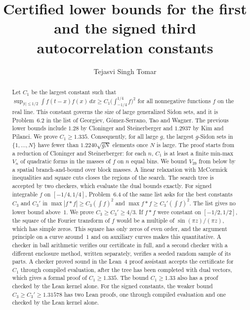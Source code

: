 \documentclass[11pt]{amsart}
\theoremstyle{definition}
\theoremstyle{remark}
\numberwithin{equation}{section}
\newcommand{\Cone}{1.335}
\newcommand{\Nbins}{39}
\newcommand{\SidonVal}{1.2240}
\newcommand{\CthrPDec}{4/3}
\newcommand{\LeanSigDec}{1.31578}
\begin{document}
\title[Lower bounds for autocorrelation constants]{Certified lower bounds for the first and the signed third autocorrelation constants}
\author{Tejasvi Singh Tomar}
\renewcommand{\urladdrname}{{\itshape ORCID}}

\begin{abstract}
Let $C_1$ be the largest constant such that $\sup_{|t|\le 1/2}\int f(t-x)f(x)\,dx\ge C_1\bigl(\int_{-1/4}^{1/4}f\bigr)^2$ for all nonnegative functions $f$ on the real line. This constant governs the size of large generalized Sidon sets, and it is Problem~6.2 in the list of Georgiev, G\'omez-Serrano, Tao and Wagner. The previous lower bounds include $1.28$ by Cloninger and Steinerberger and $1.2937$ by Kim and Pilanci. We prove $C_1\ge \Cone$. Consequently, for all large $g$, the largest $g$-Sidon sets in $\{1,\dots,N\}$ have fewer than $\SidonVal\sqrt{gN}$ elements once $N$ is large. The proof starts from a reduction of Cloninger and Steinerberger: for each $n$, $C_1$ is at least a finite min-max $V_n$ of quadratic forms in the masses of $f$ on $n$ equal bins. We bound $V_{\Nbins}$ from below by a spatial branch-and-bound over block masses. A linear relaxation with McCormick inequalities and square cuts closes the regions of the search. The search tree is accepted by two checkers, which evaluate the dual bounds exactly. For signed integrable $f$ on $[-1/4,1/4]$, Problem~6.4 of the same list asks for the best constants $C_3$ and $C_3'$ in $\max|f*f|\ge C_3(\int f)^2$ and $\max f*f\ge C_3'(\int f)^2$. The list gives no lower bound above~$1$. We prove $C_3\ge C_3'\ge \CthrPDec$. If $f*f$ were constant on $[-1/2,1/2]$, the square of the Fourier transform of $f$ would be a multiple of $\sin(\pi z)/(\pi z)$, which has simple zeros. This square has only zeros of even order, and the argument principle on a curve around~$1$ and on auxiliary curves makes this quantitative. A checker in ball arithmetic verifies our certificate in full, and a second checker with a different enclosure method, written separately, verifies a seeded random sample of its parts. A checker proved sound in the Lean~4 proof assistant accepts the certificate for $C_1$ through compiled evaluation, after the tree has been completed with dual vectors, which gives a formal proof of $C_1\ge\Cone$. The bound $C_1\ge1.33$ also has a proof checked by the Lean kernel alone. For the signed constants, the weaker bound $C_3\ge C_3'\ge\LeanSigDec$ has two Lean proofs, one through compiled evaluation and one checked by the Lean kernel alone. %
\end{abstract}
\end{document}
